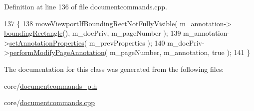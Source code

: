 Definition at line 136 of file documentcommands.\+cpp.


\begin{DoxyCode}
137 \{
138     \hyperlink{namespaceOkular_a1e0f22fec5a200bd3b1835b7bfd95172}{moveViewportIfBoundingRectNotFullyVisible}( m\_annotation->
      \hyperlink{classOkular_1_1Annotation_a450fbd08aeb31262a33a628b4ab0dd42}{boundingRectangle}(), m\_docPriv, m\_pageNumber );
139     m\_annotation->\hyperlink{classOkular_1_1Annotation_aea088e2d137bc017f0b78cce86642ff1}{setAnnotationProperties}( m\_prevProperties );
140     m\_docPriv->\hyperlink{classOkular_1_1DocumentPrivate_ac6a83ec146be14eee48aa70ac02f7350}{performModifyPageAnnotation}( m\_pageNumber,  m\_annotation, \textcolor{keyword}{true} );
141 \}
\end{DoxyCode}


The documentation for this class was generated from the following files\+:\begin{DoxyCompactItemize}
\item 
core/\hyperlink{documentcommands__p_8h}{documentcommands\+\_\+p.\+h}\item 
core/\hyperlink{documentcommands_8cpp}{documentcommands.\+cpp}\end{DoxyCompactItemize}
